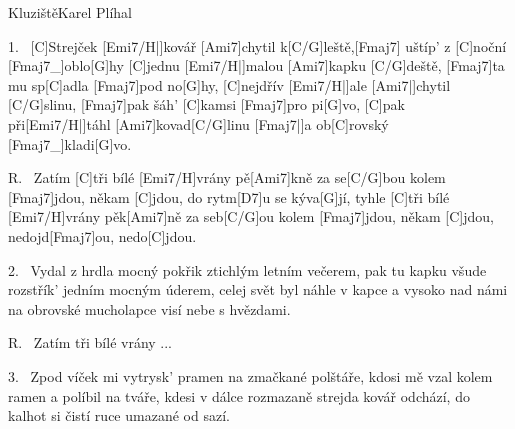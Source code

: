 \begin{song}{Kluziště}{Karel Plíhal}

\begin{xverse}{1.~}
[\large C]Strejček [\large Emi7/H|]{kovář} [\large Ami7]chytil k[\large C/G]leště,[\large Fmaj7] uštíp' z [\large C]noční [\large Fmaj7_]{oblo}[\large G]{hy}
[\large C]jednu [\large Emi7/H|]{malou} [\large Ami7]kapku [\large C/G]deště, [\large Fmaj7]ta mu sp[\large C]adla [\large Fmaj7]pod no[\large G]{hy,}
[\large C]nejdřív [\large Emi7/H|]{ale} [\large Ami7|]{chytil} [\large C/G]slinu, [\large Fmaj7]pak šáh' [\large C]kamsi [\large Fmaj7]pro pi[\large G]{vo,}
[\large C]pak při[\large Emi7/H|]{táhl} [\large Ami7]kovad[\large C/G]linu [\large Fmaj7|]{}a ob[\large C]rovský [\large Fmaj7_]{kladi}[\large G]{vo.}
\end{xverse}

\begin{xverse}{R.~}
Zatím [\large C]tři bílé [\large Emi7/H]vrány pě[\large Ami7]kně za se[\large C/G]bou
kolem [\large Fmaj7]jdou, někam [\large C]jdou, do rytm[\large D7]u se kýva[\large G]jí,
tyhle [\large C]tři bílé [\large Emi7/H]{vrány} pěk[\large Ami7]ně za seb[\large C/G]ou
kolem [\large Fmaj7]jdou, někam [\large C]jdou, nedojd[\large Fmaj7]ou, nedo[\large C]jdou.
\end{xverse}

\begin{xverse}{2.~}
Vydal z hrdla mocný pokřik ztichlým letním večerem,
pak tu kapku všude rozstřík' jedním mocným úderem,
celej svět byl náhle v kapce a vysoko nad námi
na obrovské mucholapce visí nebe s hvězdami.
\end{xverse}

\begin{xverse}{R.~}
Zatím tři bílé vrány ...
\end{xverse}

\begin{xverse}{3.~}
Zpod víček mi vytrysk' pramen na zmačkané polštáře,
kdosi mě vzal kolem ramen a políbil na tváře,
kdesi v dálce rozmazaně strejda kovář odchází,
do kalhot si čistí ruce umazané od sazí.
\end{xverse}
\end{song}
\chords{ \chordAmiSeven \chordFmajSeven }


